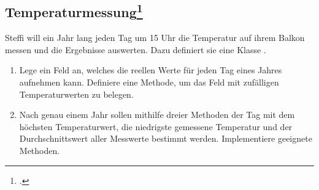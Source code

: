 \documentclass{lehramt-informatik}
\begin{document}
\begin{itemize}
%

\section{Temperaturmessung\footcite[Seite 61, Klett, Informatik 3, S. 68]{oomup:fs:3}}

Steffi will ein Jahr lang jeden Tag um 15 Uhr die Temperatur auf ihrem
Balkon messen und die Ergebnisse auswerten. Dazu definiert sie eine
Klasse .

\begin{enumerate}


\item Lege ein Feld  an, welches die reellen Werte für
jeden Tag eines Jahres aufnehmen kann. Definiere eine Methode, um das
Feld mit zufälligen Temperaturwerten zu belegen.


\item Nach genau einem Jahr sollen mithilfe dreier Methoden der Tag mit
dem höchsten Temperaturwert, die niedrigste gemessene Temperatur und der
Durchschnittswert aller Messwerte bestimmt werden. Implementiere
geeignete Methoden.

\begin{antwort}
\end{antwort}

\end{enumerate}

\end{itemize}

\literatur
\end{document}

